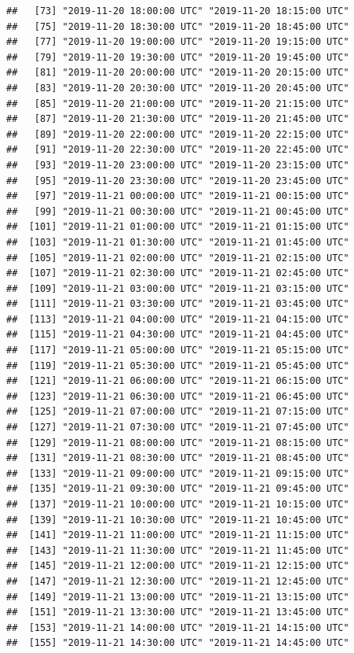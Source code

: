 \documentclass{article}\usepackage[]{graphicx}\usepackage[]{color}
\makeatletter
\newenvironment{kframe}{%
 \def\at@end@of@kframe{}%
 \ifinner\ifhmode%
  \def\at@end@of@kframe{\end{minipage}}%
  \begin{minipage}{\columnwidth}%
 \fi\fi%
 \def\FrameCommand##1{\hskip\@totalleftmargin \hskip-\fboxsep
 \colorbox{shadecolor}{##1}\hskip-\fboxsep
     \hskip-\linewidth \hskip-\@totalleftmargin \hskip\columnwidth}%
 \MakeFramed {\advance\hsize-\width
   \@totalleftmargin\z@ \linewidth\hsize
   \@setminipage}}%
 {\par\unskip\endMakeFramed%
 \at@end@of@kframe}
\newenvironment{knitrout}{}{} %
\makeatother
\begin{document}
\begin{knitrout}
\begin{kframe}
\begin{verbatim}
##   [73] "2019-11-20 18:00:00 UTC" "2019-11-20 18:15:00 UTC"
##   [75] "2019-11-20 18:30:00 UTC" "2019-11-20 18:45:00 UTC"
##   [77] "2019-11-20 19:00:00 UTC" "2019-11-20 19:15:00 UTC"
##   [79] "2019-11-20 19:30:00 UTC" "2019-11-20 19:45:00 UTC"
##   [81] "2019-11-20 20:00:00 UTC" "2019-11-20 20:15:00 UTC"
##   [83] "2019-11-20 20:30:00 UTC" "2019-11-20 20:45:00 UTC"
##   [85] "2019-11-20 21:00:00 UTC" "2019-11-20 21:15:00 UTC"
##   [87] "2019-11-20 21:30:00 UTC" "2019-11-20 21:45:00 UTC"
##   [89] "2019-11-20 22:00:00 UTC" "2019-11-20 22:15:00 UTC"
##   [91] "2019-11-20 22:30:00 UTC" "2019-11-20 22:45:00 UTC"
##   [93] "2019-11-20 23:00:00 UTC" "2019-11-20 23:15:00 UTC"
##   [95] "2019-11-20 23:30:00 UTC" "2019-11-20 23:45:00 UTC"
##   [97] "2019-11-21 00:00:00 UTC" "2019-11-21 00:15:00 UTC"
##   [99] "2019-11-21 00:30:00 UTC" "2019-11-21 00:45:00 UTC"
##  [101] "2019-11-21 01:00:00 UTC" "2019-11-21 01:15:00 UTC"
##  [103] "2019-11-21 01:30:00 UTC" "2019-11-21 01:45:00 UTC"
##  [105] "2019-11-21 02:00:00 UTC" "2019-11-21 02:15:00 UTC"
##  [107] "2019-11-21 02:30:00 UTC" "2019-11-21 02:45:00 UTC"
##  [109] "2019-11-21 03:00:00 UTC" "2019-11-21 03:15:00 UTC"
##  [111] "2019-11-21 03:30:00 UTC" "2019-11-21 03:45:00 UTC"
##  [113] "2019-11-21 04:00:00 UTC" "2019-11-21 04:15:00 UTC"
##  [115] "2019-11-21 04:30:00 UTC" "2019-11-21 04:45:00 UTC"
##  [117] "2019-11-21 05:00:00 UTC" "2019-11-21 05:15:00 UTC"
##  [119] "2019-11-21 05:30:00 UTC" "2019-11-21 05:45:00 UTC"
##  [121] "2019-11-21 06:00:00 UTC" "2019-11-21 06:15:00 UTC"
##  [123] "2019-11-21 06:30:00 UTC" "2019-11-21 06:45:00 UTC"
##  [125] "2019-11-21 07:00:00 UTC" "2019-11-21 07:15:00 UTC"
##  [127] "2019-11-21 07:30:00 UTC" "2019-11-21 07:45:00 UTC"
##  [129] "2019-11-21 08:00:00 UTC" "2019-11-21 08:15:00 UTC"
##  [131] "2019-11-21 08:30:00 UTC" "2019-11-21 08:45:00 UTC"
##  [133] "2019-11-21 09:00:00 UTC" "2019-11-21 09:15:00 UTC"
##  [135] "2019-11-21 09:30:00 UTC" "2019-11-21 09:45:00 UTC"
##  [137] "2019-11-21 10:00:00 UTC" "2019-11-21 10:15:00 UTC"
##  [139] "2019-11-21 10:30:00 UTC" "2019-11-21 10:45:00 UTC"
##  [141] "2019-11-21 11:00:00 UTC" "2019-11-21 11:15:00 UTC"
##  [143] "2019-11-21 11:30:00 UTC" "2019-11-21 11:45:00 UTC"
##  [145] "2019-11-21 12:00:00 UTC" "2019-11-21 12:15:00 UTC"
##  [147] "2019-11-21 12:30:00 UTC" "2019-11-21 12:45:00 UTC"
##  [149] "2019-11-21 13:00:00 UTC" "2019-11-21 13:15:00 UTC"
##  [151] "2019-11-21 13:30:00 UTC" "2019-11-21 13:45:00 UTC"
##  [153] "2019-11-21 14:00:00 UTC" "2019-11-21 14:15:00 UTC"
##  [155] "2019-11-21 14:30:00 UTC" "2019-11-21 14:45:00 UTC"

\end{verbatim}
\end{kframe}
\end{knitrout}
\end{document}
